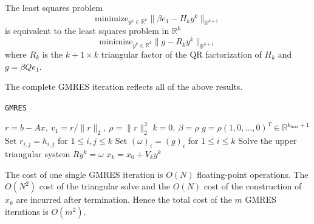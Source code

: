 \begin{lemma}
  The least squares problem
  $$\text{minimize}_{y^k\in\mathbb{R}^k}\|\beta
  e_1-H_ky^k\|_{\mathbb{R}^{k+1}}$$
  is equivalent to the least squares problem in $\mathbb{R}^k$
  $$\text{minimize}_{y^k\in\mathbb{R}^k}\|g-R_ky^k\|_{\mathbb{R}^{k+1}}$$
  where $R_k$ is the $k+1\times k$ triangular factor of the QR
  factorization of $H_k$ and $g=\beta Qe_1$.
\end{lemma}


\begin{algo}
  The complete GMRES iteration reflects all of the above results.

  \IncMargin{1em}
  \LinesNumbered
  \begin{algorithm}[H]

    \caption{\texttt{GMRES}}
    \BlankLine
    $r=b-Ax,\ v_1=r/\|r\|_2,\ \rho=\|r\|_2^2$\;
    $k=0,\ \beta=\rho$\;
    $g=\rho(1,0,\ldots,0)^T\in\mathbb{R}^{k_{\text{max}}+1}$\;
    Set $r_{i,j}=h_{i,j}$ for $1\leq i,j\leq k$\;
    Set $(\omega)_i=(g)_i$ for $1\leq i\leq k$\;
    Solve the upper triangular system $Ry^k=\omega$\;
    $x_k=x_0+V_ky^k$\;
  \end{algorithm}
  \DecMargin{1em}
\end{algo}

\begin{rmk}
  The cost of one single GMRES iteration is $O(N)$ floating-point
  operations. The $O(N^2)$ cost of the triangular solve and the $O(N)$
  cost of the construction of $x_k$ are incurred after
  termination. Hence the total cost of the $m$ GMRES iterations is $O(m^2)$.
\end{rmk}

